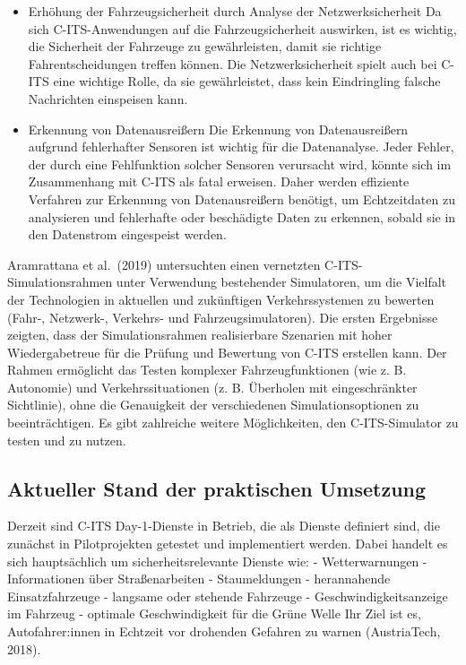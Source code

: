 \documentclass[
]{book}
\begin{document}
\begin{itemize}
\item
  Erhöhung der Fahrzeugsicherheit durch Analyse der Netzwerksicherheit
  Da sich C-ITS-Anwendungen auf die Fahrzeugsicherheit auswirken, ist es wichtig, die Sicherheit der Fahrzeuge zu gewährleisten, damit sie richtige Fahrentscheidungen treffen können. Die Netzwerksicherheit spielt auch bei C-ITS eine wichtige Rolle, da sie gewährleistet, dass kein Eindringling falsche Nachrichten einspeisen kann.
\item
  Erkennung von Datenausreißern
  Die Erkennung von Datenausreißern aufgrund fehlerhafter Sensoren ist wichtig für die Datenanalyse. Jeder Fehler, der durch eine Fehlfunktion solcher Sensoren verursacht wird, könnte sich im Zusammenhang mit C-ITS als fatal erweisen. Daher werden effiziente Verfahren zur Erkennung von Datenausreißern benötigt, um Echtzeitdaten zu analysieren und fehlerhafte oder beschädigte Daten zu erkennen, sobald sie in den Datenstrom eingespeist werden.
\end{itemize}

Aramrattana et al.~(2019) untersuchten einen vernetzten C-ITS-Simulationsrahmen unter Verwendung bestehender Simulatoren, um die Vielfalt der Technologien in aktuellen und zukünftigen Verkehrssystemen zu bewerten (Fahr-, Netzwerk-, Verkehrs- und Fahrzeugsimulatoren). Die ersten Ergebnisse zeigten, dass der Simulationsrahmen realisierbare Szenarien mit hoher Wiedergabetreue für die Prüfung und Bewertung von C-ITS erstellen kann. Der Rahmen ermöglicht das Testen komplexer Fahrzeugfunktionen (wie z. B. Autonomie) und Verkehrssituationen (z. B. Überholen mit eingeschränkter Sichtlinie), ohne die Genauigkeit der verschiedenen Simulationsoptionen zu beeinträchtigen. Es gibt zahlreiche weitere Möglichkeiten, den C-ITS-Simulator zu testen und zu nutzen.

\hypertarget{aktueller-stand-der-praktischen-umsetzung-12}{%
\subsection*{Aktueller Stand der praktischen Umsetzung}\label{aktueller-stand-der-praktischen-umsetzung-12}}

Derzeit sind C-ITS Day-1-Dienste in Betrieb, die als Dienste definiert sind, die zunächst in Pilotprojekten getestet und implementiert werden. Dabei handelt es sich hauptsächlich um sicherheitsrelevante Dienste wie:
- Wetterwarnungen
- Informationen über Straßenarbeiten
- Staumeldungen
- herannahende Einsatzfahrzeuge
- langsame oder stehende Fahrzeuge
- Geschwindigkeitsanzeige im Fahrzeug
- optimale Geschwindigkeit für die Grüne Welle
Ihr Ziel ist es, Autofahrer:innen in Echtzeit vor drohenden Gefahren zu warnen (AustriaTech, 2018).
\end{document}

